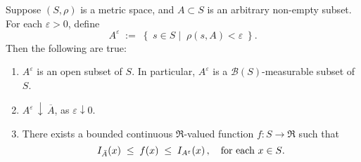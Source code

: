 
\begin{lemma}
\label{LemmaAEpsilon}
\quad
Suppose $\left(S,\rho\right)$ is a metric space, and $A \subset S$ is an arbitrary non-empty subset.
For each $\varepsilon > 0$, define
\begin{equation*}
A^{\varepsilon} \;:=\;
\left\{\;
s \in S
\;\left\vert\;\;
\rho(s,A) < \varepsilon
\right.
\;\right\}.
\end{equation*}
Then the following are true:
\begin{enumerate}
\item
	$A^{\varepsilon}$ is an open subset of $S$. In particular, $A^{\varepsilon}$ is a $\mathcal{B}(S)$-measurable subset of $S$.
\item
	$A^{\varepsilon}\,\downarrow\,\overline{A}$, as $\varepsilon \downarrow 0$.
\item
	There exists a bounded continuous $\Re$-valued function $f : S \longrightarrow \Re$
	such that
	\begin{equation*}
	I_{\bar{A}}(x) \;\leq\; f(x) \;\leq\; I_{A^{\varepsilon}}(x)\,,
	\quad\textnormal{for each $x \in S$}.
	\end{equation*}
\end{enumerate}	
\end{lemma}
\proof
